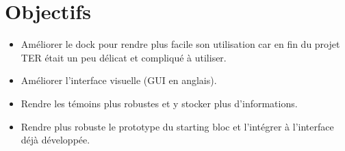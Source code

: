 \documentclass[12pt]{article}
\begin{document}

\section{Objectifs}
\begin{itemize}
	\item Améliorer le dock pour rendre plus facile son utilisation car en fin du projet TER était un peu délicat et compliqué à utiliser.
	\item Améliorer l'interface visuelle (GUI en anglais).
	\item Rendre les témoins plus robustes et y stocker plus d'informations.
	\item Rendre plus robuste le prototype du starting bloc et l'intégrer à l'interface déjà développée.
\end{itemize}
\end{document}
